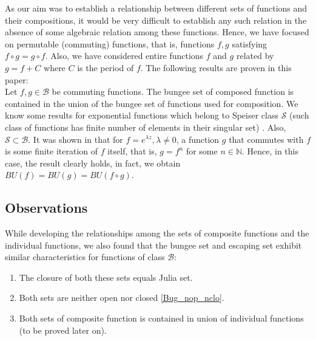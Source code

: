 \documentclass[a4paper,12pt]{amsart}
\newcommand{\la}{\lambda}
\newcommand{\N}{\mathbb{N}}
\numberwithin{equation}{section}
\begin{document}
As our aim was to establish a relationship between different sets of functions and their compositions,  it would be very difficult to establish any such relation in the absence of some algebraic relation among these functions. Hence, we have focused on permutable (commuting) functions, that is, functions $f, g$ satisfying $f \circ g =g \circ f.$ Also, we have considered entire functions $f$ and $g$ related by $g = f+ C$ where $C$ is the period of $f$. 
The following results are proven in this paper:\\
Let $f,g \in \mathcal{B}$ be commuting functions. The bungee set of composed function  is contained in the union of the bungee set of functions used for composition. 
We know some results for exponential functions which belong to Speiser class $\mathcal{S}$ (such class of functions has finite number of elements in their singular set) \cite{sch}. Also, $\mathcal{S} \subset \mathcal{B}$. It was shown in \cite{baker2} that for $f= e^{\lambda z}, \la\neq 0$, a function $g$ that commutes  with $f$ is some finite iteration of $f$ itself, that is, $g=f^n$ for some $n\in\N$. Hence, 
in this case, the result clearly holds, in fact, we obtain $BU(f)=BU(g)=BU(f\circ g).$

\subsection{Observations}
While developing the relationships among the sets of composite functions and the individual functions, we also found
that the bungee set and escaping set exhibit similar characteristics for functions of class $\mathcal{B}$:
\begin{enumerate}
\item The closure of both these sets equals Julia set.
\item Both sets are neither open nor closed \eqref{Bug_nop_nclo}.
\item Both sets of composite function is contained in union of individual functions (to be proved later on).
\end{enumerate}
\end{document}
